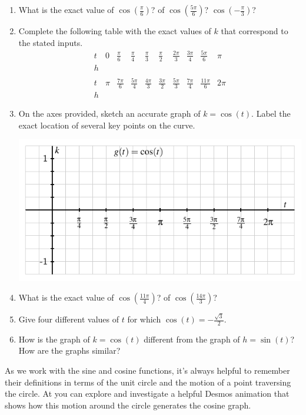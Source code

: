 \documentclass[nooutcomes]{ximera}
\begin{document}
\begin{exploration}
\begin{enumerate}[label=\alph*.]
\item What is the exact value of \(\cos(\frac{\pi}{6})\)?  of \(\cos(\frac{5\pi}{6})\)? \(\cos(-\frac{\pi}{3})\)?
\item Complete the following table with the exact values of \(k\) that correspond to the stated inputs.
\[
\begin{array}{llllllllll}
t&0&\frac{\pi}{6}&\frac{\pi}{4}&\frac{\pi}{3}&\frac{\pi}{2}&\frac{2\pi}{3}&\frac{3\pi}{4}&\frac{5\pi}{6}&\pi\\
\hline
h&&&&&&&&&\\
&&&&&&&&&\\
t&\pi&\frac{7\pi}{6}&\frac{5\pi}{4}&\frac{4\pi}{3}&\frac{3\pi}{2}&\frac{5\pi}{3}&\frac{7\pi}{4}&\frac{11\pi}{6}&2\pi\\
\hline
h&&&&&&&&&
\end{array}
\]
\item On the axes provided, sketch an accurate graph of \(k = \cos(t)\).  Label the exact location of several key points on the curve.
\begin{image}
\includegraphics{sine-cosine-definition-axes.pdf}
\end{image}
\item What is the exact value of \(\cos( \frac{11\pi}{4} )\)? of \(\cos( \frac{14\pi}{3} )\)?
\item Give four different values of \(t\) for which \(\cos(t) = -\frac{\sqrt{3}}{2}\).
\item How is the graph of \(k = \cos(t)\) different from the graph of \(h = \sin(t)\)?  How are the graphs similar?
\end{enumerate}

\end{exploration}

As we work with the sine and cosine functions, it's always helpful to remember their definitions in terms of the unit circle and the motion of a point traversing the circle.  At  you can explore and investigate a helpful Desmos animation that shows how this motion around the circle generates the cosine graph.
\end{document}

